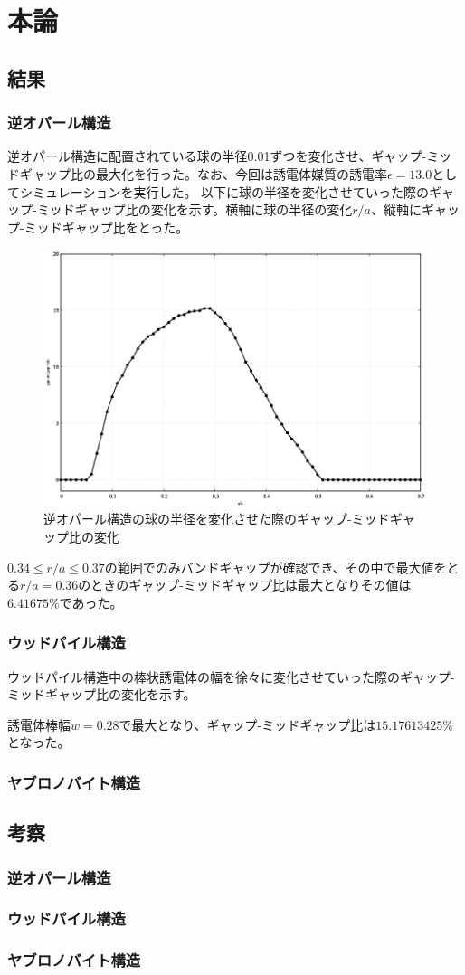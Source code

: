 \documentclass[platex,dvipdfmx]{jsreport}
\numberwithin{equation}{section}
\begin{document}
\chapter{本論}


\section{結果}
\subsection{逆オパール構造}
逆オパール構造に配置されている球の半径0.01ずつを変化させ、ギャップ-ミッドギャップ比の最大化を行った。なお、今回は誘電体媒質の誘電率$\epsilon = 13.0$としてシミュレーションを実行した。
以下に球の半径を変化させていった際のギャップ-ミッドギャップ比の変化を示す。横軸に球の半径の変化$r / a$、縦軸にギャップ-ミッドギャップ比をとった。

\begin{figure}[htbp]
  \centering
  \includegraphics[width=0.8\linewidth]{results/inv_opals.png}
  \caption{逆オパール構造の球の半径を変化させた際のギャップ-ミッドギャップ比の変化}
  \label{fig:inv_opal}
\end{figure}

$0.34 \leq r / a \leq 0.37$の範囲でのみバンドギャップが確認でき、その中で最大値をとる$r / a = 0.36$のときのギャップ-ミッドギャップ比は最大となりその値は$6.41675 \% $であった。



\subsection{ウッドパイル構造}
ウッドパイル構造中の棒状誘電体の幅を徐々に変化させていった際のギャップ-ミッドギャップ比の変化を示す。

誘電体棒幅$w = 0.28$で最大となり、ギャップ-ミッドギャップ比は$15.17613425 \%$となった。

\subsection{ヤブロノバイト構造}
\section{考察}
\subsection{逆オパール構造}
\subsection{ウッドパイル構造}
\subsection{ヤブロノバイト構造}
\end{document}
